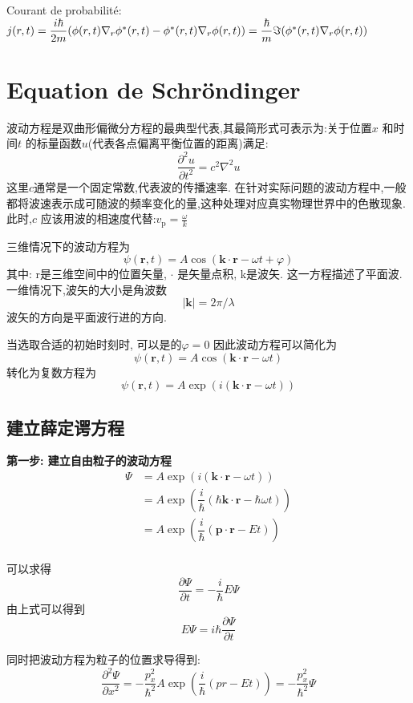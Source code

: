 \documentclass{article}
\begin{document}
Courant de probabilit\'e: $j(r,t) = \dfrac{i\hbar}{2m} (\phi(r,t) \nabla _r{\phi^*(r,t)} - \phi^*(r,t) \nabla _r{\phi(r,t)}) = \dfrac{\hbar}{m} \Im{(\phi^*(r,t) \nabla _r{\phi(r,t)})} $

\section{Equation de Schr\"ondinger}
波动方程是双曲形偏微分方程的最典型代表,其最简形式可表示为:关于位置$x$ 和时间$t$ 的标量函数$u$(代表各点偏离平衡位置的距离)满足:
$$ \dfrac{\partial^2 u}{\partial t^2} = c^2 \nabla^2u $$
这里$c$通常是一个固定常数,代表波的传播速率.
在针对实际问题的波动方程中,一般都将波速表示成可随波的频率变化的量,这种处理对应真实物理世界中的色散现象.此时,$ c$  应该用波的相速度代替:$v_\mathrm{p} = \frac{\omega}{k}$

三维情况下的波动方程为
$$ \psi \left({\mathbf r}, t \right) = A \cos \left({\mathbf k} \cdot {\mathbf r} - \omega t + \varphi \right) $$
其中:
r是三维空间中的位置矢量,
$\cdot$ 是矢量点积,
k是波矢.
这一方程描述了平面波.一维情况下,波矢的大小是角波数
$$|{\mathbf k}| = 2\pi/\lambda$$
波矢的方向是平面波行进的方向.

当选取合适的初始时刻时, 可以是的$\varphi = 0$
因此波动方程可以简化为
$$ \psi \left({\mathbf r}, t \right) = A \cos \left({\mathbf k} \cdot {\mathbf r} - \omega t \right) $$
转化为复数方程为
$$ \psi \left({\mathbf r}, t \right) = A \exp (i ({\mathbf k} \cdot {\mathbf r} - \omega t)) $$

\subsection{建立薛定谔方程}
\textbf{第一步: 建立自由粒子的波动方程}
$$
\begin{aligned}
\Psi 
& = A \exp (i ({\mathbf k} \cdot {\mathbf r} - \omega t)) \\
& = A \exp (\dfrac{i}{\hbar} (\hbar {\mathbf k} \cdot {\mathbf r} - \hbar \omega t)) \\
& = A \exp (\dfrac{i}{\hbar} ({\mathbf p} \cdot {\mathbf r} - E t)) \\
\end{aligned}
$$

可以求得
$$ \dfrac{\partial \Psi}{\partial t} = - \dfrac{i}{\hbar} E \Psi $$
由上式可以得到
$$E \Psi = i \hbar \dfrac{\partial \Psi}{\partial t}$$

同时把波动方程为粒子的位置求导得到:
$$
\dfrac{\partial^2 \Psi}{\partial x^2} 
= -\dfrac{p_x^2}{\hbar^2} A \exp(\dfrac{i}{\hbar} (p r - E t))
= -\dfrac{p_x^2}{\hbar^2} \Psi
$$
\end{document}
